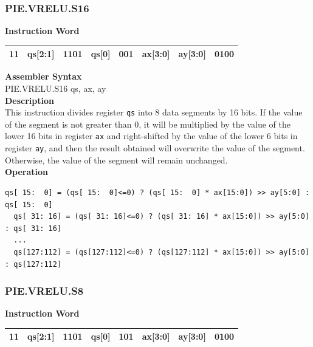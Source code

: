 \newpage
\subsubsection{PIE.VRELU.S16}\label{instruction:PIEVRELUS16}
\setlength\tabcolsep{6pt}
\textbf{Instruction Word} \\
\begin{tabular}{|c|c|c|c|c|c|c|c|}
	\hline
	11 & qs[2:1] & 1101 & qs[0] & 001 & ax[3:0] & ay[3:0] & 0100 \\
	\hline
\end{tabular}

\textbf{Assembler Syntax} \\
PIE.VRELU.S16 qs, ax, ay \\
\textbf{Description} \\
This instruction divides register \lstinline{qs} into 8 data segments by 16 bits. If the value of the segment is not greater than 0, it will be multiplied by the value of the lower 16 bits in register \lstinline{ax} and right-shifted by the value of the lower 6 bits in register \lstinline{ay}, and then the result obtained will overwrite the value of the segment. Otherwise, the value of the segment will remain unchanged.\\
\textbf{Operation}
\begin{lstlisting}[escapeinside=`?]
  qs[ 15:  0] = (qs[ 15:  0]<=0) ? (qs[ 15:  0] * ax[15:0]) >> ay[5:0] : qs[ 15:  0]
  qs[ 31: 16] = (qs[ 31: 16]<=0) ? (qs[ 31: 16] * ax[15:0]) >> ay[5:0] : qs[ 31: 16]
  ...
  qs[127:112] = (qs[127:112]<=0) ? (qs[127:112] * ax[15:0]) >> ay[5:0] : qs[127:112]
\end{lstlisting}

\newpage
\subsubsection{PIE.VRELU.S8}\label{instruction:PIEVRELUS8}
\setlength\tabcolsep{6pt}
\textbf{Instruction Word} \\
\begin{tabular}{|c|c|c|c|c|c|c|c|}
	\hline
	11 & qs[2:1] & 1101 & qs[0] & 101 & ax[3:0] & ay[3:0] & 0100 \\
	\hline
\end{tabular}

